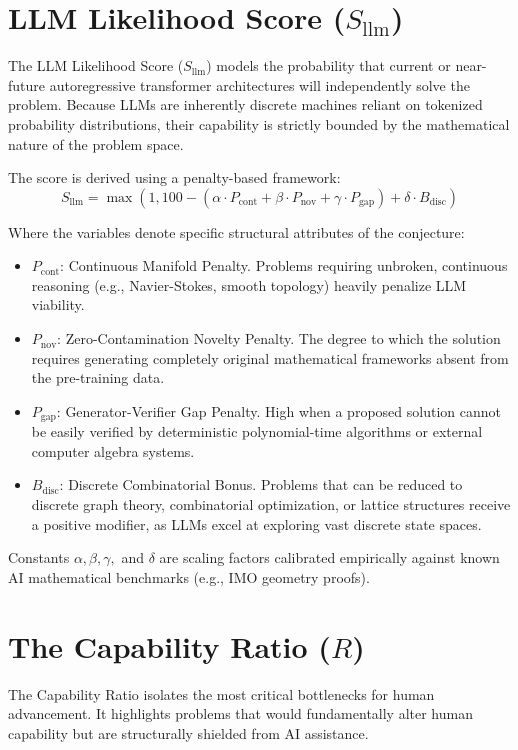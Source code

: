 \documentclass[11pt, letterpaper]{article}
\begin{document}
\section{LLM Likelihood Score ($S_{\text{llm}}$)}
The LLM Likelihood Score ($S_{\text{llm}}$) models the probability that current or near-future autoregressive transformer architectures will independently solve the problem. Because LLMs are inherently discrete machines reliant on tokenized probability distributions, their capability is strictly bounded by the mathematical nature of the problem space.

The score is derived using a penalty-based framework:
\begin{equation}
S_{\text{llm}} = \max \left( 1, 100 - \left( \alpha \cdot P_{\text{cont}} + \beta \cdot P_{\text{nov}} + \gamma \cdot P_{\text{gap}} \right) + \delta \cdot B_{\text{disc}} \right)
\end{equation}

Where the variables denote specific structural attributes of the conjecture:
\begin{itemize}
    \item $P_{\text{cont}}$: Continuous Manifold Penalty. Problems requiring unbroken, continuous reasoning (e.g., Navier-Stokes, smooth topology) heavily penalize LLM viability.
    \item $P_{\text{nov}}$: Zero-Contamination Novelty Penalty. The degree to which the solution requires generating completely original mathematical frameworks absent from the pre-training data.
    \item $P_{\text{gap}}$: Generator-Verifier Gap Penalty. High when a proposed solution cannot be easily verified by deterministic polynomial-time algorithms or external computer algebra systems.
    \item $B_{\text{disc}}$: Discrete Combinatorial Bonus. Problems that can be reduced to discrete graph theory, combinatorial optimization, or lattice structures receive a positive modifier, as LLMs excel at exploring vast discrete state spaces.
\end{itemize}
Constants $\alpha, \beta, \gamma,$ and $\delta$ are scaling factors calibrated empirically against known AI mathematical benchmarks (e.g., IMO geometry proofs).

\section{The Capability Ratio ($R$)}
The Capability Ratio isolates the most critical bottlenecks for human advancement. It highlights problems that would fundamentally alter human capability but are structurally shielded from AI assistance.
\end{document}
